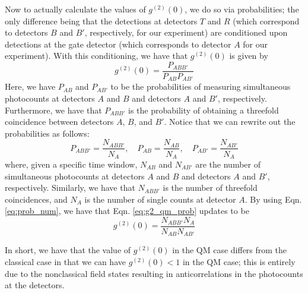 \documentclass[twocolumn,amsmath,amssymb,pra]{revtex4-2}
\begin{document}
Now to actually calculate the values of $g^{(2)}(0)$, we do so via probabilities; the only difference being that the detections at detectors $T$ and $R$ (which correspond to detectors $B$ and $B'$, respectively, for our experiment) are conditioned upon detections at the gate detector (which corresponds to detector $A$ for our experiment). With this conditioning, we have that $g^{(2)}(0)$ is given by 
\begin{equation}
    g^{(2)}(0)
    =
    \frac{P_{ABB'}}{P_{AB} P_{AB'}}
    \label{eq:g2_qm_prob}
\end{equation}
Here, we have $P_{AB}$ and $P_{AB'}$ to be the probabilities of measuring simultaneous photocounts at detectors $A$ and $B$ and detectors $A$ and $B'$, respectively. Furthermore, we have that $P_{ABB'}$ is the probability of obtaining a threefold coincidence between detectors $A$, $B$, and $B'$. Notice that we can rewrite out the probabilities as follows: 
\begin{equation}
    P_{ABB'}
    =
    \frac{N_{ABB'}}{N_{A}},
    \quad
    P_{AB}
    =
    \frac{N_{AB}}{N_{A}},
    \quad
    P_{AB'}
    =
    \frac{N_{AB'}}{N_{A}}
    \label{eq:prob_num}
\end{equation}
where, given a specific time window, $N_{AB}$ and $N_{AB'}$ are the number of simultaneous photocounts at detectors $A$ and $B$ and detectors $A$ and $B'$, respectively. Similarly, we have that $N_{ABB'}$ is the number of threefold coincidences, and $N_{A}$ is the number of single counts at detector $A$. By using Eqn. \ref{eq:prob_num}, we have that Eqn. \ref{eq:g2_qm_prob} updates to be 
\begin{equation}
    g^{(2)}(0)
    =
    \frac{N_{ABB'} N_{A}}{N_{AB} N_{AB'}}
    \label{eq:g2_qm_num}
\end{equation}

In short, we have that the value of $g^{(2)}(0)$ in the QM case differs from the classical case in that we can have $g^{(2)}(0) < 1$ in the QM case; this is entirely due to the nonclassical field states resulting in anticorrelations in the photocounts at the detectors.
\end{document}
